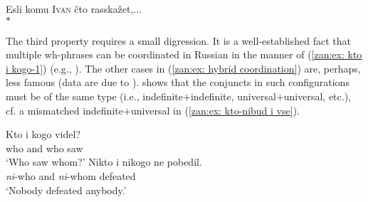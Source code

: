 \documentclass[output=paper,colorlinks,citecolor=brown]{langscibook}
\begin{document}
\ea \label{zan:ex: split cluster-Q}
\z
\z

\ea \label{zan:ex: split cluster-Cond}
 \z
\z

\ea \label{zan:ex: split cluster-Cond-2}
\begin{tabbing} \textsuperscript{}  Esli komu \textsc{Iv}\=\textsc{an}  čto rasskažet,...\\
    \>  $\ast$
        \end{tabbing}
\z

\noindent The third property requires a small digression. It is a well-established fact that multiple wh-phrases can be coordinated in Russian in the manner of (\ref{zan:ex: kto i kogo-1}) (e.g., \citealt{gribanova2009structural}). The other cases in (\ref{zan:ex: hybrid coordination}) are, perhaps, less famous (data are due to \citealt{paperno2012semantics}). \citeauthor{paperno2012semantics} shows that the conjuncts in such configurations must be of the same type (i.e., indefinite$+$indefinite, universal$+$universal, etc.), cf. a mismatched indefinite$+$universal in (\ref{zan:ex: kto-nibud i vse}).

\ea \label{zan:ex: hybrid coordination}
\ea \label{zan:ex: kto i kogo-1}
        \gll  Kto i kogo videl?\\
        who and who saw\\
        \glt `Who saw whom?'
 \ex
        \gll Nikto i nikogo ne pobedil.\\
        \textit{ni}-who and \textit{ni}-whom {\NEG} defeated\\
        \glt `Nobody defeated anybody.'
       
\end{document}

